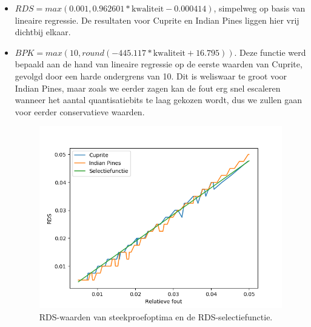 \begin{itemize}
\item $RDS = max(0.001, 0.962601*\text{kwaliteit} - 0.000414)$, simpelweg op basis van lineaire regressie. De resultaten voor Cuprite en Indian Pines liggen hier vrij dichtbij elkaar.
\item $BPK = max(10, round(-445.117*\text{kwaliteit} + 16.795))$. Deze functie werd bepaald aan de hand van lineaire regressie op de eerste waarden van Cuprite, gevolgd door een harde ondergrens van 10. Dit is weliswaar te groot voor Indian Pines, maar zoals we eerder zagen kan de fout erg snel escaleren wanneer het aantal quantisatiebits te laag gekozen wordt, dus we zullen gaan voor eerder conservatieve waarden.
\newpage

\begin{figure}[H]
  \centering
  \includegraphics[scale=0.7]{images/filtered_sweep_points_RDS.png}
  \caption{RDS-waarden van steekproefoptima en de RDS-selectiefunctie.}
  \label{fig:filtered_sweep_points_RDS}
\end{figure}


\end{itemize}
